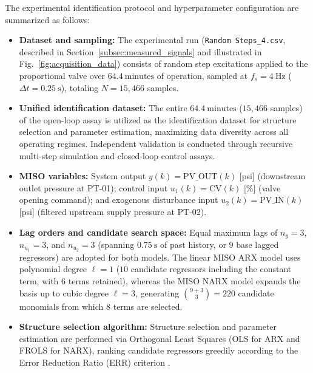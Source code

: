 \documentclass{ifacconf}
\begin{document}
The experimental identification protocol and hyperparameter configuration are summarized as follows:
\begin{itemize}
    \item \textbf{Dataset and sampling:} The experimental run (\texttt{Random Steps\_4.csv}, described in Section~\ref{subsec:measured_signals} and illustrated in Fig.~\ref{fig:acquisition_data}) consists of random step excitations applied to the proportional valve over $64.4~\text{minutes}$ of operation, sampled at $f_s = 4~\text{Hz}$ ($\Delta t = 0.25~\text{s}$), totaling $N = 15,466$ samples.
    
    \item \textbf{Unified identification dataset:} The entire $64.4~\text{minutes}$ ($15,466$ samples) of the open-loop assay is utilized as the identification dataset for structure selection and parameter estimation, maximizing data diversity across all operating regimes. Independent validation is conducted through recursive multi-step simulation and closed-loop control assays.
    
    \item \textbf{MISO variables:} System output $y(k) = \mathrm{PV\_OUT}(k)$ [psi] (downstream outlet pressure at PT-01); control input $u_1(k) = \mathrm{CV}(k)$ [\%] (valve opening command); and exogenous disturbance input $u_2(k) = \mathrm{PV\_IN}(k)$ [psi] (filtered upstream supply pressure at PT-02).
    
    \item \textbf{Lag orders and candidate search space:} Equal maximum lags of $n_y = 3$, $n_{u_1} = 3$, and $n_{u_2} = 3$ (spanning $0.75~\text{s}$ of past history, or $9$ base lagged regressors) are adopted for both models. The linear MISO ARX model uses polynomial degree $\ell = 1$ ($10$ candidate regressors including the constant term, with $6$ terms retained), whereas the MISO NARX model expands the basis up to cubic degree $\ell = 3$, generating $\binom{9+3}{3} = 220$ candidate monomials from which $8$ terms are selected.
    
    \item \textbf{Structure selection algorithm:} Structure selection and parameter estimation are performed via Orthogonal Least Squares (OLS for ARX and FROLS for NARX), ranking candidate regressors greedily according to the Error Reduction Ratio (ERR) criterion \citep{Chen1989Orthogonal,Billings2013Nonlinear}.
    

\end{itemize}
\end{document}
